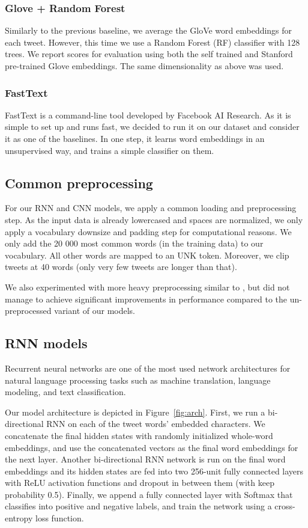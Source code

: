 \documentclass[10pt,conference,compsocconf]{IEEEtran}
\begin{document}
\subsubsection{Glove + Random Forest}
Similarly to the previous baseline, we average the GloVe word embeddings for each tweet. However, this time we use a Random Forest (RF) classifier \cite{random-forests} with 128 trees. We report scores for evaluation using both the self trained and Stanford pre-trained Glove embeddings. The same dimensionality as above was used.

\subsubsection{FastText}
FastText \cite{joulin2017bag} is a command-line tool developed by Facebook AI Research. As it is simple to set up and runs fast, we decided to run it on our dataset and consider it as one of the baselines. In one step, it learns word embeddings in an unsupervised way, and trains a simple classifier on them. 

\subsection{Common preprocessing}
For our RNN and CNN models, we apply a common loading and preprocessing step. As the input data is already lowercased and spaces are normalized, we only apply a vocabulary downsize and padding step for computational reasons.
We only add the 20 000 most common words (in the training data) to our vocabulary. All other words are mapped to an UNK token. Moreover, we clip tweets at 40 words (only very few tweets are longer than that).

We also experimented with more heavy preprocessing similar to \cite{twitter_preprocessing}, but did not manage to achieve significant improvements in performance compared to the un-preprocessed variant of our models.

\subsection{RNN models}
Recurrent neural networks are one of the most used network architectures for natural language processing tasks such as machine translation, language modeling, and text classification.

Our model architecture is depicted in Figure~\ref{fig:arch}. First, we run a bi-directional RNN on each of the tweet words' embedded characters. We concatenate the final hidden states with randomly initialized whole-word embeddings, and use the concatenated vectors as the final word embeddings for the next layer.
Another bi-directional RNN network is run on the final word embeddings and its hidden states are fed into two 256-unit fully connected layers with ReLU activation functions and dropout \cite{dropout1,dropout2} in between them (with keep probability 0.5). Finally, we append a fully connected layer with Softmax that classifies into positive and negative labels,
and train the network using a cross-entropy loss function. 
\end{document}
